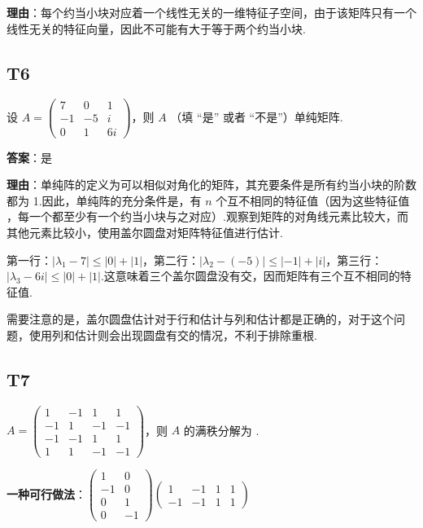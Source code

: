 \documentclass{article}
\begin{document}
\par \textbf{理由}：每个约当小块对应着一个线性无关的一维特征子空间，由于该矩阵只有一个线性无关的特征向量，因此不可能有大于等于两个约当小块.

\subsection{T6}

\par 设 $A=\begin{pmatrix}
	7 & 0 & 1\\
	-1 & -5 & i\\
	0 & 1 & 6i
\end{pmatrix}$，则 $A$ \underline{\phantom{empty\_space}}（填 “是” 或者 “不是”）单纯矩阵.

\par \textbf{答案}：是

\par \textbf{理由}：单纯阵的定义为可以相似对角化的矩阵，其充要条件是所有约当小块的阶数都为 1.因此，单纯阵的充分条件是，有 $n$ 个互不相同的特征值（因为这些特征值 ，每一个都至少有一个约当小块与之对应）.观察到矩阵的对角线元素比较大，而其他元素比较小，使用盖尔圆盘对矩阵特征值进行估计.

第一行：$|\lambda_1-7|\leq |0| + |1|$，第二行：$|\lambda_2-(-5)|\leq |-1| + |i|$，第三行：$|\lambda_3-6i|\leq |0| + |1|$.这意味着三个盖尔圆盘没有交，因而矩阵有三个互不相同的特征值.

需要注意的是，盖尔圆盘估计对于行和估计与列和估计都是正确的，对于这个问题，使用列和估计则会出现圆盘有交的情况，不利于排除重根.

\subsection{T7}

\par $A=\begin{pmatrix}
	1 & -1 & 1 & 1\\
	-1 & 1 & -1 & -1\\
	-1 & -1 & 1 & 1\\
	1 & 1 & -1 & -1
\end{pmatrix}$，则 $A$ 的满秩分解为 \underline{\phantom{empty\_space}}.

\par \textbf{一种可行做法}：$\begin{pmatrix}
	1 & 0\\
	-1 & 0\\
	0 & 1\\
	0 & -1
\end{pmatrix} \begin{pmatrix}
	1 & -1 & 1 & 1\\
	-1 & -1 & 1 & 1
\end{pmatrix}$
\end{document}
